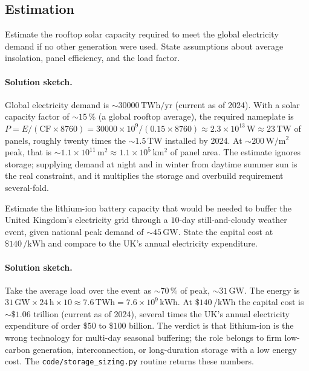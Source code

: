\subsection*{Estimation}

\begin{exercise}
Estimate the rooftop solar capacity required to meet the global
electricity demand if no other generation were used. State
assumptions about average insolation, panel efficiency, and the
load factor.
\paragraph{Solution sketch.}
Global electricity demand is $\sim 30000\,\text{TWh}/\text{yr}$
(current as of 2024). With a solar capacity factor of $\sim 15\,\%$
(a global rooftop average), the required nameplate is $P =
E/(\text{CF}\times8760) = 30000\times10^9/(0.15\times8760) \approx
2.3\times10^{13}\,\si{\watt} \approx 23\,\si{\tera\watt}$ of panels,
roughly twenty times the $\sim 1.5\,\si{\tera\watt}$ installed by 2024.
At $\sim 200\,\si{\watt\per\meter\squared}$ peak, that is $\sim 1.1
\times10^{11}\,\si{\meter\squared} \approx 1.1\times10^{5}\,\si{\kilo
\meter\squared}$ of panel area. The estimate ignores storage; supplying
demand at night and in winter from daytime summer sun is the real
constraint, and it multiplies the storage and overbuild requirement
several-fold.
\end{exercise}

\begin{exercise}
Estimate the lithium-ion battery capacity that would be needed to
buffer the United Kingdom's electricity grid through a
$10$-day still-and-cloudy weather event, given national peak demand
of $\sim 45\,\si{\giga\watt}$. State the capital cost at $\$140\,\si{
\per\kilo\watt\hour}$ and compare to the UK's annual electricity
expenditure.
\paragraph{Solution sketch.}
Take the average load over the event as $\sim 70\,\%$ of peak, $\sim
31\,\si{\giga\watt}$. The energy is $31\,\si{\giga\watt}\times24\,\si{
\hour}\times10 \approx 7.6\,\text{TWh} = 7.6\times10^{9}\,\si{\kilo\watt
\hour}$. At $\$140\,\si{\per\kilo\watt\hour}$ the capital cost is
$\sim \$1.06$ trillion (current as of 2024), several times the UK's
annual electricity expenditure of order $\$50$ to $\$100$ billion. The
verdict is that lithium-ion is the wrong technology for multi-day
seasonal buffering; the role belongs to firm low-carbon generation,
interconnection, or long-duration storage with a low energy cost. The
\texttt{code/storage\_sizing.py} routine returns these numbers.
\end{exercise}

